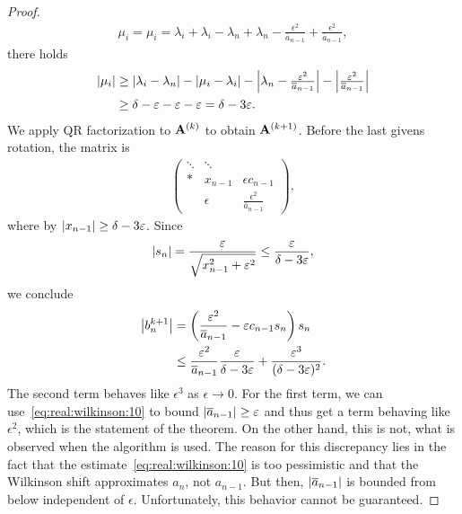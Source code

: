 \begin{proof}
\begin{gather}
  \mu_i = \mu_i = \lambda_i+\lambda_i-\lambda_n+\lambda_n
  -\tfrac{\epsilon^2}{\overline a_{n-1}}+\tfrac{\epsilon^2}{\overline a_{n-1}},
\end{gather}
there holds
\begin{align}
  \abs*{\mu_i}
  &\ge \abs*{\lambda_i-\lambda_n} - \abs*{\mu_i-\lambda_i}
    - \abs*{\lambda_n - \tfrac{\epsilon^2}{\overline a_{n-1}}}
    - \abs*{\tfrac{\epsilon^2}{\overline a_{n-1}}}\\
  &\ge \delta - \epsilon - \epsilon -\epsilon = \delta-3\epsilon.
\end{align}
We apply QR factorization to $\mata^{(k)}$ to obtain
$\mata^{(k+1)}$. Before the last givens rotation, the matrix is
\begin{gather}
  \begin{pmatrix}
    \ddots&\ddots&\\
    * & x_{n-1} & \epsilon c_{n-1}\\
    & \epsilon & \tfrac{\epsilon^2}{\overline a_{n-1}}
  \end{pmatrix},
\end{gather}
where by  $\abs{x_{n-1}} \ge \delta-3\epsilon$. Since
\begin{gather}
  \abs{s_n} = \frac{\epsilon}{\sqrt{x_{n-1}^2+\epsilon^2}} \le \frac{\epsilon}{\delta-3\epsilon},
\end{gather}
we conclude
\begin{align}
  \abs*{b_n^{k+1}}
  &= \left(\frac{\epsilon^2}{\overline a_{n-1}} - \epsilon c_{n-1}s_n \right) s_n\\
  &\le \frac{\epsilon^2}{\overline a_{n-1}} \frac{\epsilon}{\delta-3\epsilon}
    + \frac{\epsilon^3}{(\delta-3\epsilon)^2}.
\end{align}
The second term behaves like $\epsilon^3$ as $\epsilon\to0$. For the
first term, we can use~\eqref{eq:real:wilkinson:10} to bound
$\abs{\overline a_{n-1}}\ge\epsilon$ and thus get a term behaving like
$\epsilon^2$, which is the statement of the theorem. On the other
hand, this is not, what is observed when the algorithm is used. The
reason for this discrepancy lies in the fact that the
estimate~\eqref{eq:real:wilkinson:10} is too pessimistic and that the
Wilkinson shift approximates $a_n$, not $a_{n-1}$. But then,
$\abs{\overline a_{n-1}}$ is bounded from below independent of
$\epsilon$. Unfortunately, this behavior cannot be guaranteed.
\end{proof}

